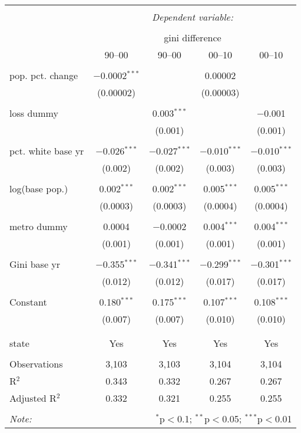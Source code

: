 
\begin{table}[!htbp] \centering 
  \caption{} 
  \label{} 
\begin{tabular}{@{\extracolsep{5pt}}lcccc} 
\\[-1.8ex]\hline 
\hline \\[-1.8ex] 
 & \multicolumn{4}{c}{\textit{Dependent variable:}} \\ 
\cline{2-5} 
\\[-1.8ex] & \multicolumn{4}{c}{gini difference} \\ 
 & 90--00 & 90--00 & 00--10 & 00--10 \\ 
\hline \\[-1.8ex] 
 pop. pct. change & $-$0.0002$^{***}$ &  & 0.00002 &  \\ 
  & (0.00002) &  & (0.00003) &  \\ 
  & & & & \\ 
 loss dummy &  & 0.003$^{***}$ &  & $-$0.001 \\ 
  &  & (0.001) &  & (0.001) \\ 
  & & & & \\ 
 pct. white base yr & $-$0.026$^{***}$ & $-$0.027$^{***}$ & $-$0.010$^{***}$ & $-$0.010$^{***}$ \\ 
  & (0.002) & (0.002) & (0.003) & (0.003) \\ 
  & & & & \\ 
 log(base pop.) & 0.002$^{***}$ & 0.002$^{***}$ & 0.005$^{***}$ & 0.005$^{***}$ \\ 
  & (0.0003) & (0.0003) & (0.0004) & (0.0004) \\ 
  & & & & \\ 
 metro dummy & 0.0004 & $-$0.0002 & 0.004$^{***}$ & 0.004$^{***}$ \\ 
  & (0.001) & (0.001) & (0.001) & (0.001) \\ 
  & & & & \\ 
 Gini base yr & $-$0.355$^{***}$ & $-$0.341$^{***}$ & $-$0.299$^{***}$ & $-$0.301$^{***}$ \\ 
  & (0.012) & (0.012) & (0.017) & (0.017) \\ 
  & & & & \\ 
 Constant & 0.180$^{***}$ & 0.175$^{***}$ & 0.107$^{***}$ & 0.108$^{***}$ \\ 
  & (0.007) & (0.007) & (0.010) & (0.010) \\ 
  & & & & \\ 
\hline \\[-1.8ex] 
state & Yes & Yes & Yes & Yes \\ 
\hline \\[-1.8ex] 
Observations & 3,103 & 3,103 & 3,104 & 3,104 \\ 
R$^{2}$ & 0.343 & 0.332 & 0.267 & 0.267 \\ 
Adjusted R$^{2}$ & 0.332 & 0.321 & 0.255 & 0.255 \\ 
\hline 
\hline \\[-1.8ex] 
\textit{Note:}  & \multicolumn{4}{r}{$^{*}$p$<$0.1; $^{**}$p$<$0.05; $^{***}$p$<$0.01} \\ 
\end{tabular} 
\end{table} 
